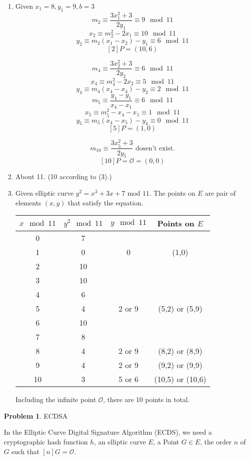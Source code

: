 \documentclass[12pt]{article}
\theoremstyle{definition}
\newtheorem{problem}{Problem}
\begin{document}
\begin{enumerate}
    \item Given $x_1=8,y_1=9,b=3$
    $$m_2\equiv\frac{3x_1^2+3}{2y_1}\equiv9\mod11$$
    $$x_2\equiv m_2^2-2x_1\equiv10\mod11$$
    $$y_2\equiv m_2(x_1-x_2)-y_1\equiv6\mod11$$
    $$[2]P=(10,6)$$
    
    $$m_4\equiv\frac{3x_2^2+3}{2y_2}\equiv6\mod11$$
    $$x_4\equiv m_4^2-2x_2\equiv5\mod11$$
    $$y_4\equiv m_4(x_4-x_4)-y_2\equiv2\mod11$$
    $$m_5\equiv\frac{y_4-y_1}{x_4-x_1}\equiv6\mod11$$
    $$x_5\equiv m_5^2-x_4-x_1\equiv1\mod11$$
    $$y_5\equiv m_5(x_4-x_5)-y_4\equiv0\mod11$$
    $$[5]P=(1,0)$$
    
    $$m_{10}\equiv\frac{3x_5^2+3}{2y_5}\text{ dosen't exist.}$$
    $$[10]P=\mathcal{O}=(0,0)$$
    \item About 11. (10 according to (3).)
    \item Given elliptic curve $y^2=x^3+3x+7 \text{ mod }11$. The points on $E$ are pair of elements $(x,y)$ that satisfy the equation.
    \begin{center}
    \begin{tabular}{cccc}
    \hline
    $x\mod11$ & $y^2\mod11$ & $y\mod11$ & Points on $E$\\\hline
    0  & 7  & \\
    1  & 0  & 0 & (1,0)\\
    2  & 10 & \\
    3  & 10 & \\
    4  & 6  &  \\
    5  & 4  & 2 or 9 & (5,2) or (5,9) \\
    6  & 10 & \\
    7  & 8  & \\
    8  & 4  & 2 or 9 & (8,2) or (8,9) \\
    9  & 4  & 2 or 9 & (9,2) or (9,9) \\
    10 & 3  & 5 or 6 & (10,5) or (10,6) \\\hline
    \end{tabular}
    \end{center}
    Including the infinite point $\mathcal{O}$, there are 10 points in total.
\end{enumerate}

\begin{problem}
ECDSA
\end{problem}

In the Elliptic Curve Digital Signature Algorithm (ECDS), we need a cryptographic hash function $h$, an elliptic curve $E$, a Point $G\in E$, the order $n$ of $G$ such that $[n]G=\mathcal{O}$.
\end{document}
